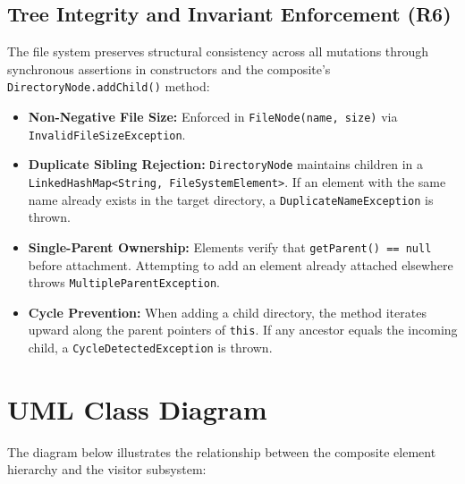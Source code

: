 \documentclass[11pt,a4paper]{article}
\begin{document}
\subsection{Tree Integrity and Invariant Enforcement (R6)}
The file system preserves structural consistency across all mutations through synchronous assertions in constructors and the composite's \texttt{DirectoryNode.addChild()} method:
\begin{itemize}\itemsep 0pt
    \item \textbf{Non-Negative File Size:} Enforced in \texttt{FileNode(name, size)} via \texttt{InvalidFileSizeException}.
    \item \textbf{Duplicate Sibling Rejection:} \texttt{DirectoryNode} maintains children in a \texttt{LinkedHashMap<String, FileSystemElement>}. If an element with the same name already exists in the target directory, a \texttt{DuplicateNameException} is thrown.
    \item \textbf{Single-Parent Ownership:} Elements verify that \texttt{getParent() == null} before attachment. Attempting to add an element already attached elsewhere throws \texttt{MultipleParentException}.
    \item \textbf{Cycle Prevention:} When adding a child directory, the method iterates upward along the parent pointers of \texttt{this}. If any ancestor equals the incoming child, a \texttt{CycleDetectedException} is thrown.
\end{itemize}

\section{UML Class Diagram}
The diagram below illustrates the relationship between the composite element hierarchy and the visitor subsystem:
\end{document}
